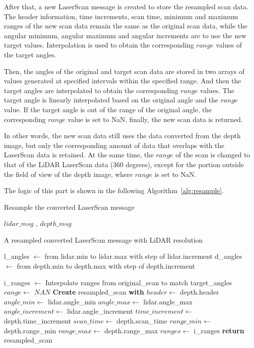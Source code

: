 After that, a new LaserScan message is created to store the resampled scan data. 
The header information, time increments, scan time, minimum and maximum ranges of the new scan data 
remain the same as the original scan data, 
while the angular minimum, angular maximum and angular increments are to use the new target values. 
Interpolation is used to obtain the corresponding $range$ values of the target angles.

Then, the angles of the original and target scan data are stored 
in two arrays of values generated at specified intervals within the specified range. 
And then the target angles are interpolated to obtain the corresponding $range$ values. 
The target angle is linearly interpolated based on the original angle and the $range$ value. 
If the target angle is out of the range of the original angle, 
the corresponding $range$ value is set to NaN. finally, the new scan data is returned.

In other words, the new scan data still uses the data converted from the depth image, 
but only the corresponding amount of data that overlaps with the LaserScan data is retained. 
At the same time, the $range$ of the scan is changed to that of the LiDAR LaserScan data (360 degrees), 
except for the portion outside the field of view of the depth image, where $range$ is set to NaN.

The logic of this part is shown in the following Algorithm~\ref{alg:resample}.
\begin{algorithm}[H]
    \caption{Resample the converted LaserScan message}\label{alg:resample}
    \begin{algorithmic}
        \Require $lidar\_msg$ , $depth\_msg$ 
    
        \Ensure A resampled converted LaserScan message with LiDAR resolution

        \State l\_angles $\gets$ from lidar.min to lidar.max with step of lidar.increment
        \State d\_angles $\gets$ from depth.min to depth.max with step of depth.increment

        \State i\_ranges $\gets$ Interpolate ranges from original\_scan to match target\_angles
            \State $range \gets$ $NAN$
        \EndIf
        \State \textbf{Create} resampled\_scan \textbf{with}
            \State $header \gets$ depth.header
            \State $angle\_min \gets$ lidar.angle\_min
            \State $angle\_max \gets$ lidar.angle\_max
            \State $angle\_increment \gets$ lidar.angle\_increment
            \State $time\_increment \gets$ depth.time\_increment
            \State $scan\_time \gets$ depth.scan\_time
            \State $range\_min \gets$ depth.range\_min
            \State $range\_max \gets$ depth.range\_max
            \State $ranges \gets$ i\_ranges
        \State \textbf{return} resampled\_scan
    \end{algorithmic}
\end{algorithm}